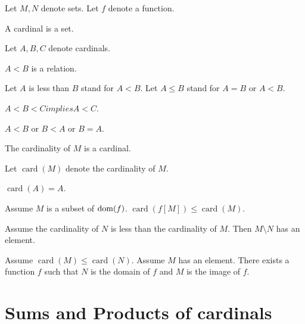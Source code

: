 \documentclass[english]{article}
\newcommand{\card}[1]{\operatorname{card}(#1)}
\begin{document}
\begin{forthel}
  Let $M, N$ denote sets.
  Let $f$ denote a function.

  \begin{signature}
    A cardinal is a set.
  \end{signature}

  Let $A, B, C$ denote cardinals.

  \begin{signature}
    $A < B$ is a relation.
  \end{signature}

  Let $A$ is less than $B$ stand for $A < B$.
  Let $A \leq B$ stand for $A = B$ or $A < B$.

  \begin{axiom}
    $A < B < C implies A < C$.
  \end{axiom}

  \begin{axiom}
    $A < B$ or $B < A$ or $B = A$.
  \end{axiom}

  \begin{signature}
    The cardinality of $M$ is a cardinal.
  \end{signature}

  Let $\card{M}$ denote the cardinality of $M$.

  \begin{axiom}
    $\card{A} = A$.
  \end{axiom}

  \begin{axiom}
    Assume $M$ is a subset of $\operatorname{dom}(f)$.
    $\card{f[M]} \leq \card{M}$.
  \end{axiom}

  \begin{axiom}
    Assume the cardinality of $N$ is less than the cardinality of $M$.
    Then $M \setminus N$ has an element.
  \end{axiom}

  \begin{axiom}\label{function_existence}
    Assume $\card{M} \leq \card{N}$.
    Assume $M$ has an element.
    There exists a function $f$ such that $N$ is the domain of $f$ and $M$ is
    the image of $f$.
  \end{axiom}
\end{forthel}


\section{Sums and Products of cardinals}
\end{document}
